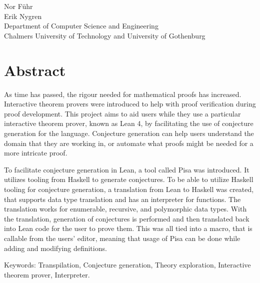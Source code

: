 \oneLineTitle\\
\oneLineSubtitle\\
Nor Führ\\
Erik Nygren\\
Department of Computer Science and Engineering\\
Chalmers University of Technology and University of Gothenburg

\thispagestyle{plain} %
\section*{Abstract}
As time has passed, the rigour needed for mathematical proofs has increased.
Interactive theorem provers were introduced to help with proof verification during proof development.
This project aims to aid users while they use a particular interactive theorem prover, known as Lean 4, by facilitating the use of conjecture generation for the language.
Conjecture generation can help users understand the domain that they are working in, or automate what proofs might be needed for a more intricate proof.

To facilitate conjecture generation in Lean, a tool called Pisa was introduced.
It utilizes tooling from Haskell to generate conjectures.
To be able to utilize Haskell tooling for conjecture generation, a translation from Lean to Haskell was created, that supports data type translation and has an interpreter for functions.
The translation works for enumerable, recursive, and polymorphic data types.
With the translation, generation of conjectures is performed and then translated back into Lean code for the user to prove them.
This was all tied into a macro, that is callable from the users' editor, meaning that usage of Pisa can be done while adding and modifying definitions.


\vfill
Keywords: Transpilation, Conjecture generation, Theory exploration, Interactive theorem prover, Interpreter.

\cleardoublepage
